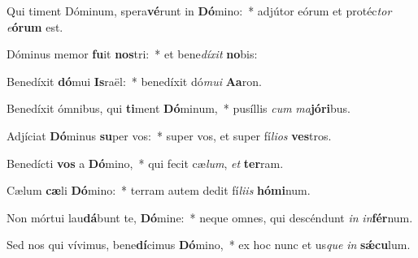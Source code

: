\item Qui timent Dóminum, spera\textbf{vé}runt in \textbf{Dó}mino:~* adjútor eórum et protéc\textit{tor} \textit{e}\textbf{ó}\textbf{rum} est.
\item Dóminus memor \textbf{fu}it \textbf{nos}tri:~* et bene\textit{dí}\textit{xit} \textbf{no}bis:
\item Benedíxit \textbf{dó}mui \textbf{Is}raël:~* benedíxit dó\textit{mu}\textit{i} \textbf{A}\textbf{a}ron.
\item Benedíxit ómnibus, qui \textbf{ti}ment \textbf{Dó}minum,~* pusíllis \textit{cum} \textit{ma}\textbf{jó}\textbf{ri}bus.
\item Adjíciat \textbf{Dó}minus \textbf{su}per vos:~* super vos, et super fí\textit{li}\textit{os} \textbf{ves}tros.
\item Benedícti \textbf{vos} a \textbf{Dó}mino,~* qui fecit cæ\textit{lum}, \textit{et} \textbf{ter}ram.
\item Cælum \textbf{cæ}li \textbf{Dó}mino:~* terram autem dedit fí\textit{li}\textit{is} \textbf{hó}\textbf{mi}num.
\item Non mórtui lau\textbf{dá}bunt te, \textbf{Dó}mine:~* neque omnes, qui descéndunt \textit{in} \textit{in}\textbf{fér}num.
\item Sed nos qui vívimus, bene\textbf{dí}cimus \textbf{Dó}mino,~* ex hoc nunc et us\textit{que} \textit{in} \textbf{sǽ}\textbf{cu}lum.
